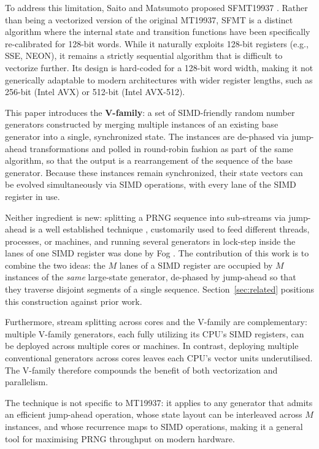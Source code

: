 \documentclass[preprint,1p,times]{elsarticle}
\begin{document}
To address this limitation, Saito and Matsumoto proposed SFMT19937 \cite{sfmt19937}. Rather than being a vectorized version of the original MT19937, SFMT is a distinct algorithm where the internal state and transition functions have been specifically re-calibrated for 128-bit words. While it naturally exploits 128-bit registers (e.g., SSE, NEON), it remains a strictly sequential algorithm that is difficult to vectorize further. Its design is hard-coded for a 128-bit word width, making it not generically adaptable to modern architectures with wider register lengths, such as 256-bit (Intel AVX) or 512-bit (Intel AVX-512).

This paper introduces the \textbf{V-family}: a set of SIMD-friendly random number generators constructed by merging multiple instances of an existing base generator into a single, synchronized state. The instances are de-phased via jump-ahead transformations and polled in round-robin fashion as part of the same algorithm, so that the output is a rearrangement of the sequence of the base generator.
Because these instances remain synchronized, their state vectors can be evolved simultaneously via SIMD operations, with every lane of the SIMD register in use.

Neither ingredient is new: splitting a PRNG sequence into sub-streams via jump-ahead is a well established technique \cite{multistream}, customarily used to feed different threads, processes, or machines, and running several generators in lock-step inside the lanes of one SIMD register was done by Fog \cite{fog}. The contribution of this work is to combine the two ideas: the $M$ lanes of a SIMD register are occupied by $M$ instances of the \emph{same} large-state generator, de-phased by jump-ahead so that they traverse disjoint segments of a single sequence. Section~\ref{sec:related} positions this construction against prior work.

Furthermore, stream splitting across cores and the V-family are complementary: multiple V-family generators, each fully utilizing its CPU's SIMD registers, can be deployed across multiple cores or machines. In contrast, deploying multiple conventional generators across cores leaves each CPU's vector units underutilised. The V-family therefore compounds the benefit of both vectorization and parallelism.

The technique is not specific to MT19937: it applies to any generator that admits an efficient jump-ahead operation, whose state layout can be interleaved across $M$ instances, and whose recurrence maps to SIMD operations, making it a general tool for maximising PRNG throughput on modern hardware.
\end{document}
